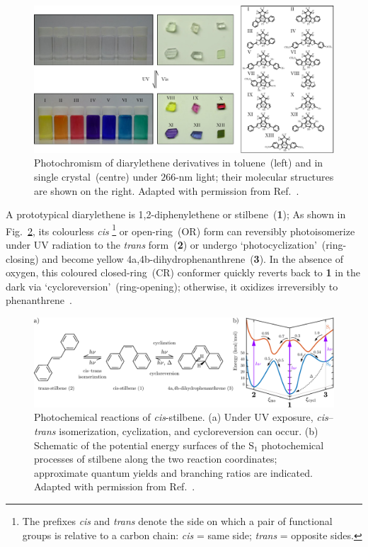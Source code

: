 \begin{figure}[t!]
  \centering
  \includegraphics[width = \textwidth]{Figures/fig_DAE_overview.pdf}
  \caption[Photochromism of diarylethene derivatives.]{
    Photochromism of diarylethene derivatives in toluene~(left) and
    in single crystal~(centre) under $266$-nm light;
    their molecular structures are shown on the right.
    Adapted with permission from Ref.~\cite{Irie2014}.
  }
  \label{fig: DAE-overview}
\end{figure}

A prototypical diarylethene is 1,2-diphenylethene or stilbene~(\textbf{1});
As shown in Fig.~\ref{fig: DAE-stilbene}, its colourless \textit{cis}%
\footnote{The prefixes \textit{cis} and \textit{trans} denote the side on which
a pair of functional groups is relative to a carbon chain:
\textit{cis} = same side; \textit{trans} = opposite sides.}
or open-ring~(OR) form can reversibly photoisomerize under UV radiation to
the \textit{trans} form~(\textbf{2})
or undergo `photocyclization'~(ring-closing) and become yellow 4a,4b-dihydrophenanthrene~(\textbf{3}).
In the absence of oxygen, this coloured closed-ring~(CR) conformer
quickly reverts back to \textbf{1} in the dark via `cycloreversion'~(ring-opening);
otherwise, it oxidizes irreversibly to phenanthrene~\cite{Bao2011}.
%
\begin{figure}[ht!]
  \centering
  \includegraphics[width = \textwidth]{Figures/fig_DAE_stilbene.pdf}
  \caption[Photochemical reactions of \textit{cis}-stilbene.]{
    Photochemical reactions of \textit{cis}-stilbene.
    (a) Under UV exposure, \textit{cis}--\textit{trans} isomerization,
    cyclization, and cycloreversion can occur.
    (b) Schematic of the potential energy surfaces of the S$_1$ photochemical processes
    of stilbene along the two reaction coordinates;
    approximate quantum yields and branching ratios are indicated.
    Adapted with permission from Ref.~\cite{Repinec1991}.
  }
  \label{fig: DAE-stilbene}
\end{figure}

